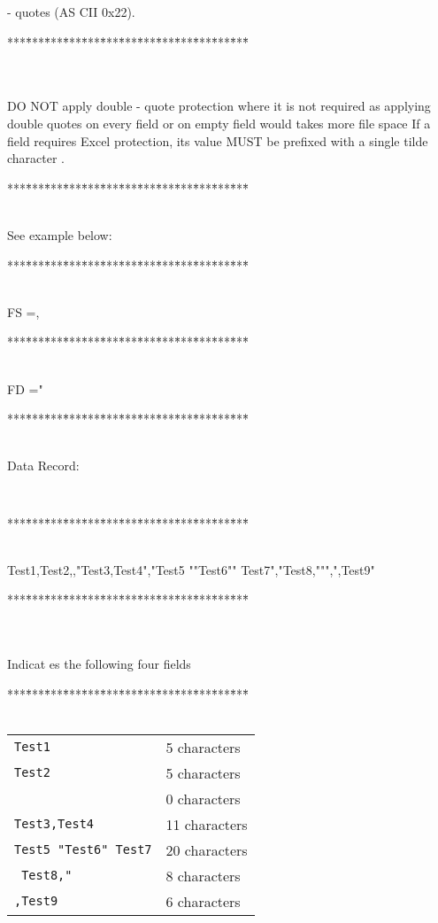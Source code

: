 -
quotes (AS
CII 0x22).
\begin{tabbing}
***\=***\=***\=***\=***\=***\=***\=***\=***\=***\=***\=***\=***\=\kill
\\
\\
\\
\end{tabbing}
DO NOT apply double
-
quote protection where it is not required as applying double quotes on every field
or on empty field
would
takes more file space
If a field requires Excel protection, its
value
MUST be prefixed with a single tilde character
.
\begin{tabbing}
***\=***\=***\=***\=***\=***\=***\=***\=***\=***\=***\=***\=***\=\kill
\\
\\
\end{tabbing}
See example below:
\begin{tabbing}
***\=***\=***\=***\=***\=***\=***\=***\=***\=***\=***\=***\=***\=\kill
\\
\\
\end{tabbing}
FS =,
\begin{tabbing}
***\=***\=***\=***\=***\=***\=***\=***\=***\=***\=***\=***\=***\=\kill
\\
\\
\end{tabbing}
FD ="
\begin{tabbing}
***\=***\=***\=***\=***\=***\=***\=***\=***\=***\=***\=***\=***\=\kill
\\
\\
\end{tabbing}
Data Record:{\tt
\begin{tabbing}
***\=***\=***\=***\=***\=***\=***\=***\=***\=***\=***\=***\=***\=\kill
\\
\\
\end{tabbing}
Test1,Test2,,"Test3,Test4","Test5 ""Test6"" Test7","Test8,""",",Test9"}
\begin{tabbing}
***\=***\=***\=***\=***\=***\=***\=***\=***\=***\=***\=***\=***\=\kill
\\
\\
\\
\end{tabbing}
Indicat
es the following four fields
\begin{tabbing}
***\=***\=***\=***\=***\=***\=***\=***\=***\=***\=***\=***\=***\=\kill
\\
\\
\end{tabbing}
\begin{tabular}{ll}
{\tt Test1}&
5
characters\\
{\tt Test2}&
5
characters\\
&
0 characters
\\
{\tt Test3,Test4}  &
11 characters
\\
{\tt Test5 "Test6" Test7}
&20  characters
\\
{\tt
Test8,"}
&8 characters
\\
{\tt ,Test9}
&6 characters
\end{tabular}
